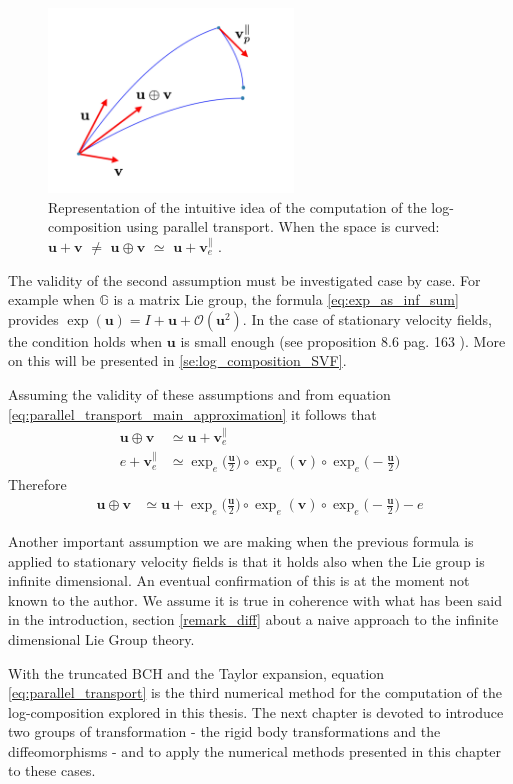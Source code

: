 \begin{figure}[htbp]
	\centering
	\includegraphics[width=6.5cm]{figures/u_plus_v_parallel_transported.pdf}
	\caption{Representation of the intuitive idea of the computation of the log-composition using parallel transport. When the space is curved: $\mathbf{u} + \mathbf{v} $ $\neq$ $\mathbf{u}\oplus \mathbf{v} $ $\simeq$ $\mathbf{u} + \mathbf{v}_{e}^{\parallel} $ .}
	\label{fig:u_plus_v_parallel_transported}
\end{figure}
The validity of the second assumption must be investigated case by case. For example when $\mathbb{G}$ is a matrix Lie group, the formula \ref{eq:exp_as_inf_sum} provides $\exp(\mathbf{u}) = I + \mathbf{u} + \mathcal{O}(\mathbf{u}^2)$. In the case of stationary velocity fields, the condition holds when $\mathbf{u}$ is small enough (see proposition 8.6 pag. 163 \cite{younes2010shapes}). More on this will be presented in \ref{se:log_composition_SVF}.

Assuming the validity of these assumptions and from equation \ref{eq:parallel_transport_main_approximation} it follows that 
\begin{align*}
\mathbf{u}\oplus \mathbf{v}
&\simeq
\mathbf{u} + \mathbf{v}_{e}^{\parallel}
\\
e + \mathbf{v}_{e}^{\parallel}
&\simeq
\exp_{e}\big(\frac{\mathbf{u}}{2}\big)   
\circ  \exp_{e}(\mathbf{v}) 
\circ \exp_{e}\big(-\frac{\mathbf{u}}{2}\big)
\end{align*}
Therefore
\begin{align}\label{eq:parallel_transport}
\mathbf{u}\oplus \mathbf{v}
&\simeq
\mathbf{u} 
+
\exp_{e}\big(\frac{\mathbf{u}}{2}\big)   
\circ  \exp_{e}(\mathbf{v}) 
\circ \exp_{e}\big(-\frac{\mathbf{u}}{2}\big)
 -
 e
\end{align}

Another important assumption we are making when the previous formula is applied to stationary velocity fields is that it holds also when the Lie group is infinite dimensional.
An eventual confirmation of this is at the moment not known to the author. We assume it is true in coherence with what has been said in the introduction, section \ref{remark_diff} about a naive approach to the infinite dimensional Lie Group theory.

With the truncated BCH and the Taylor expansion, equation \ref{eq:parallel_transport} is the third numerical method for the computation of the log-composition explored in this thesis. The next chapter is devoted to introduce two groups of transformation - the rigid body transformations and the diffeomorphisms - and to apply the numerical methods presented in this chapter to these cases.




